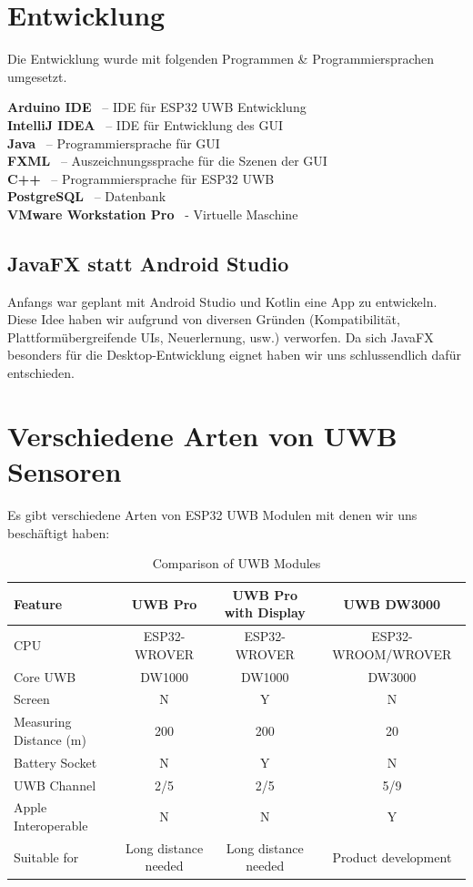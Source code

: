 \section{Entwicklung}
Die Entwicklung wurde mit folgenden Programmen \& Programmiersprachen umgesetzt.

\textbf{Arduino IDE} \ – IDE für ESP32 UWB Entwicklung \\
\textbf{IntelliJ IDEA} \ – IDE für Entwicklung des GUI \\
\textbf{Java} \ – Programmiersprache für GUI \\
\textbf{FXML} \ – Auszeichnungssprache für die Szenen der GUI \\
\textbf{C++} \ – Programmiersprache für ESP32 UWB \\
\textbf{PostgreSQL} \ – Datenbank \\
\textbf{VMware Workstation Pro} \ - Virtuelle Maschine

\subsection{JavaFX statt Android Studio}
Anfangs war geplant mit Android Studio und Kotlin eine App zu entwickeln. Diese Idee haben wir aufgrund von diversen Gründen (Kompatibilität, Plattformübergreifende UIs, Neuerlernung, usw.) verworfen. Da sich JavaFX besonders für die Desktop-Entwicklung eignet haben wir uns schlussendlich dafür entschieden.

\section{Verschiedene Arten von UWB Sensoren}

Es gibt verschiedene Arten von ESP32 UWB Modulen mit denen wir uns beschäftigt haben:

\begin{table}[h]
	\centering
	\small
	\begin{tabular}{|l|c|c|c|}
		\hline
		\textbf{Feature} & \textbf{UWB Pro} & \textbf{UWB Pro with Display} & \textbf{UWB DW3000} \\
		\hline
		CPU & ESP32-WROVER & ESP32-WROVER & ESP32-WROOM/WROVER \\
		\hline
		Core UWB & DW1000 & DW1000 & DW3000 \\
		\hline
		Screen & N & Y & N \\
		\hline
		Measuring Distance (m) & 200 & 200 & 20 \\
		\hline
		Battery Socket & N & Y & N \\
		\hline
		UWB Channel & 2/5 & 2/5 & 5/9 \\
		\hline
		Apple Interoperable & N & N & Y \\
		\hline
		Suitable for & Long distance needed & Long distance needed & Product development \\
		\hline
	\end{tabular}
	\caption{Comparison of UWB Modules}
	\label{tab:uwb_comparison}
	\parencite{ArtenSensorn}
\end{table}

